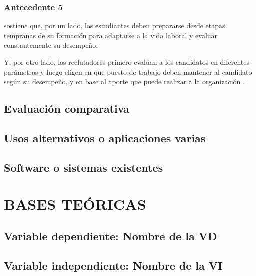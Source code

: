 \subsubsection{Antecedente 5}

\citet{IJET11738} sostiene que, por un lado, los estudiantes deben prepararse desde etapas tempranas de su formación para adaptarse a la vida laboral y evaluar constantemente su desempeño.

Y, por otro lado, los reclutadores primero evalúan a los candidatos en diferentes parámetros y luego eligen en que puesto de trabajo deben mantener al candidato según su desempeño, y en base al aporte que puede realizar a la organización \citep{IJET11738}.

\subsection{Evaluación comparativa}

\lipsum[6]

\subsection{Usos alternativos o aplicaciones varias}

\lipsum[7]

\subsection{Software o sistemas existentes}

\lipsum[8]


\section{BASES TEÓRICAS}

\subsection{Variable dependiente: Nombre de la VD}

\lipsum[9]

\subsection{Variable independiente: Nombre de la VI}

\lipsum[10]
